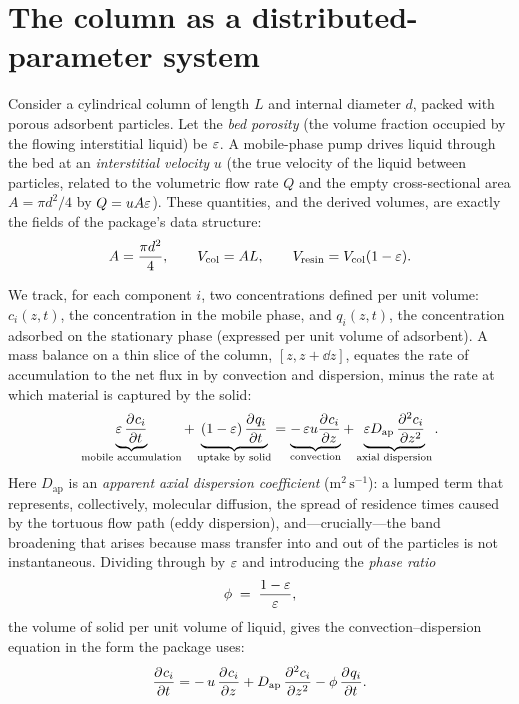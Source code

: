 \section{The column as a distributed-parameter system}
\label{sec:governing}

Consider a cylindrical column of length $L$ and internal diameter $d$, packed
with porous adsorbent particles. Let the \emph{bed porosity} (the volume
fraction occupied by the flowing interstitial liquid) be $\eps$. A
mobile-phase pump drives liquid through the bed at an \emph{interstitial
velocity} $u$ (the true velocity of the liquid between particles, related to the
volumetric flow rate $Q$ and the empty cross-sectional area $A=\pi d^2/4$ by
$Q = u A \eps$). These quantities, and the derived volumes, are exactly the
fields of the package's  data structure:
%
\begin{equation}
A = \frac{\pi d^2}{4}, \qquad
V_{\mathrm{col}} = A L, \qquad
V_{\mathrm{resin}} = V_{\mathrm{col}}(1-\eps).
\label{eq:geom}
\end{equation}

We track, for each component $i$, two concentrations defined per unit volume:
$c_i(z,t)$, the concentration in the mobile phase, and $q_i(z,t)$, the
concentration adsorbed on the stationary phase (expressed per unit volume of
adsorbent). A mass balance on a thin slice of the column, $[z, z+\dd z]$,
equates the rate of accumulation to the net flux in by convection and
dispersion, minus the rate at which material is captured by the solid:
%
\begin{equation}
\underbrace{\eps\,\pdv{c_i}{t}}_{\text{mobile accumulation}}
+ \underbrace{(1-\eps)\,\pdv{q_i}{t}}_{\text{uptake by solid}}
= \underbrace{-\,\eps u \pdv{c_i}{z}}_{\text{convection}}
+ \underbrace{\eps D_{\mathrm{ap}}\,\pdv[2]{c_i}{z}}_{\text{axial dispersion}} .
\label{eq:fullbalance}
\end{equation}
%
Here $D_{\mathrm{ap}}$ is an \emph{apparent axial dispersion coefficient}
($\mathrm{m^2\,s^{-1}}$): a lumped term that represents, collectively, molecular
diffusion, the spread of residence times caused by the tortuous flow path
(eddy dispersion), and---crucially---the band broadening that arises because mass
transfer into and out of the particles is not instantaneous. Dividing through by
$\eps$ and introducing the \emph{phase ratio}
%
\begin{equation}
\phi \;=\; \frac{1-\eps}{\eps},
\label{eq:phaseratio}
\end{equation}
%
the volume of solid per unit volume of liquid, gives the convection--dispersion
equation in the form the package uses:
%
\begin{equation}
\pdv{c_i}{t}
= -\,u\,\pdv{c_i}{z}
+ D_{\mathrm{ap}}\,\pdv[2]{c_i}{z}
- \phi\,\pdv{q_i}{t}.
\label{eq:cdmobile}
\end{equation}

